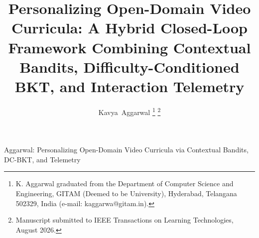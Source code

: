 \documentclass[journal]{IEEEtran}
\begin{document}
%
%
\title{Personalizing Open-Domain Video Curricula: A Hybrid Closed-Loop Framework Combining Contextual Bandits, Difficulty-Conditioned BKT, and Interaction Telemetry}

%
%
\author{Kavya~Aggarwal%
\thanks{K. Aggarwal graduated from the Department of Computer Science and Engineering, GITAM (Deemed to be University), Hyderabad, Telangana 502329, India (e-mail: kaggarwa@gitam.in).}%
\thanks{Manuscript submitted to IEEE Transactions on Learning Technologies, August 2026.}}

%
%
%
{Aggarwal: Personalizing Open-Domain Video Curricula via Contextual Bandits, DC-BKT, and Telemetry}

\maketitle
\end{document}
